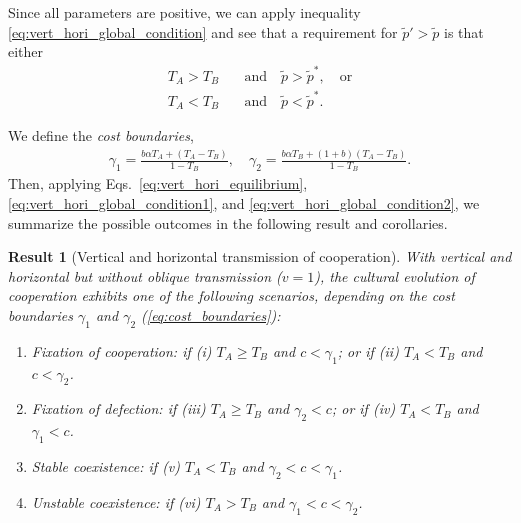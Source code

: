 \documentclass[12pt]{extarticle}
\newtheorem{result}{Result}
\begin{document}
{Since all parameters are positive, we can apply
inequality \ref{eq:vert_hori_global_condition} and see that a requirement for $\tilde{p}'>\tilde{p}$ is that either 
\begin{align} 
\label{eq:vert_hori_global_condition1}
T_A > T_B \quad&\text{and}\quad \tilde{p}>\tilde{p}^*,  \quad \text{or} \\
\label{eq:vert_hori_global_condition2}
T_A <T_B \quad&\text{and}\quad \tilde{p}<\tilde{p}^* .
\end{align}

We define the \emph{cost boundaries},
\begin{equation} \label{eq:cost_boundaries}
\begin{aligned}
\gamma_1 = \frac{b \alpha T_A + (T_A - T_B)}{1-T_B}, \quad
\gamma_2 = \frac{b \alpha T_B + (1+b) (T_A - T_B)}{1-T_B}.
\end{aligned}
\end{equation}
Then, applying Eqs.~\ref{eq:vert_hori_equilibrium}, \ref{eq:vert_hori_global_condition1}, and \ref{eq:vert_hori_global_condition2}, we  summarize the possible outcomes in the following result and corollaries.
\\

\begin{result}[Vertical and horizontal transmission of cooperation] \label{result:vert_hori}
With vertical and horizontal but without oblique transmission ($v=1$), the cultural evolution of cooperation exhibits one of the following scenarios, depending on the cost boundaries $\gamma_1$ and $\gamma_2$ (\autoref{eq:cost_boundaries}):

\begin{enumerate} %
\item \emph{Fixation of cooperation}:
	if \emph{(i)} $T_A \ge T_B$ and $c < \gamma_1$; or
	if \emph{(ii)} $T_A < T_B$ and $c < \gamma_2$.
\item \emph{Fixation of defection}:
	if \emph{(iii)} $T_A \ge T_B$ and $\gamma_2 < c$; or
	if \emph{(iv)} $T_A < T_B$ and $\gamma_1 < c$.
\item \emph{Stable coexistence}:
	if \emph{(v)} $T_A<T_B$ and $\gamma_2 < c < \gamma_1$.
\item \emph{Unstable coexistence}: 
	if \emph{(vi)} $T_A>T_B$ and $\gamma_1 < c <\gamma_2$.
\end{enumerate}
\end{result}

}
\end{document}
